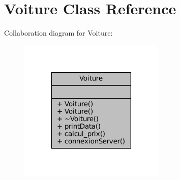\hypertarget{class_voiture}{}\section{Voiture Class Reference}
\label{class_voiture}


Collaboration diagram for Voiture\+:
\nopagebreak
\begin{figure}[H]
\begin{center}
\leavevmode
\includegraphics[width=197pt]{class_voiture__coll__graph}
\end{center}
\end{figure}
